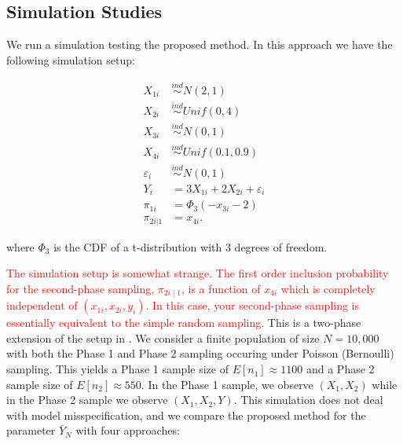 \documentclass[12pt]{article}
\begin{document}
\subsection{Simulation Studies}

We run a simulation testing the proposed method. In this approach we have the
following simulation setup:

$$
\begin{aligned}
X_{1i} &\stackrel{ind}{\sim} N(2, 1) \\
X_{2i} &\stackrel{ind}{\sim} Unif(0, 4) \\
X_{3i} &\stackrel{ind}{\sim} N(0, 1) \\
X_{4i} &\stackrel{ind}{\sim} Unif(0.1, 0.9) \\
\varepsilon_i &\stackrel{ind}{\sim} N(0, 1) \\
Y_{i} &= 3 X_{1i} + 2 X_{2i} + \varepsilon_i \\
\pi_{1i} &= \Phi_3(-x_{3i} - 2) \\
\pi_{2i|1} &= x_{4i}.
\end{aligned}
$$

where $\Phi_3$ is the CDF of a t-distribution with 3 degrees of freedom.

\textcolor{red}{The simulation setup is somewhat strange. The first order inclusion probability for the second-phase sampling, $\pi_{2i \mid 1}$, is a function of $x_{4i}$ which is completely independent of $(x_{1i}, x_{2i}, y_i)$. In this case, your second-phase sampling is essentially equivalent to the simple random sampling. }
This is a two-phase extension of the setup in \cite{kwon2024debiased}. We
consider a finite population of size $N = 10,000$ with both the Phase 1 and
Phase 2 sampling occuring under Poisson (Bernoulli) sampling. This yields a
Phase 1 sample
size of $E[n_1] \approx 1100$ and a Phase 2 sample size of
$E[n_2] \approx 550$. In the Phase 1 sample, we observe 
$(X_1, X_2)$ while in the Phase 2 sample we observe $(X_1, X_2, Y)$. This
simulation does not deal with model misspecification, and we compare the
proposed method for the parameter $\bar Y_N$ with four approaches:
\end{document}
